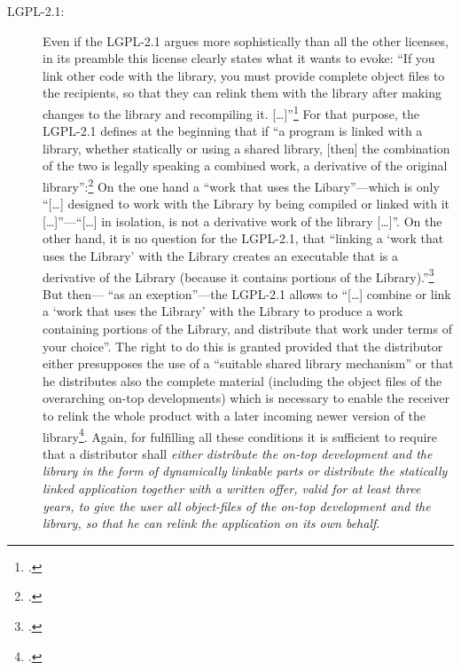 \begin{description}
  \item[LGPL-2.1:] Even if the LGPL-2.1 argues more sophistically than all
  the other licenses, in its preamble this license clearly states what it wants
  to evoke: \enquote{If you link other code with the library, you must provide
  complete object files to the recipients, so that they can relink them with the
  library after making changes to the library and recompiling it.
  [\ldots]}\footcite[cf.][\nopage wp.\ preamble]{Lgpl21OsiLicense1999a} For
  that purpose, the LGPL-2.1 defines at the beginning that if \enquote{a program
  is linked with a library, whether statically or using a shared library, [then]
  the combination of the two is legally speaking a combined work, a derivative
  of the original library}:\footcite[cf.][\nopage wp.\
  preamble]{Lgpl21OsiLicense1999a} On the one hand a \enquote{work that uses
  the Libary}---which is only \enquote{[\ldots] designed to work with the
  Library by being compiled or linked with it [\ldots]}---\enquote{[\ldots] in
  isolation, is not a derivative work of the library [\ldots]}. On the other
  hand, it is no question for the LGPL-2.1, that \enquote{linking a
  \enquote{work that uses the Library} with the Library creates an executable
  that is a derivative of the Library (because it contains portions of the
  Library).}\footcite[cf.][\nopage wp.\ §5]{Lgpl21OsiLicense1999a} But then---%
  \enquote{as an exeption}---the LGPL-2.1 allows to \enquote{[\ldots] combine
  or link a \enquote{work that uses the Library} with the Library to produce a work
  containing portions of the Library, and distribute that work under terms of
  your choice}. The right to do this is granted provided that the distributor
  either presupposes the use of a \enquote{suitable shared library mechanism} or
  that he distributes also the complete material (including the object files of
  the overarching on-top developments) which is necessary to enable the receiver
  to relink the whole product with a later incoming newer version of the
  library\footcite[cf.][\nopage wp.\ §6, §6b and §6c together with
  §6c]{Lgpl21OsiLicense1999a}. Again, for fulfilling all these conditions it is
  sufficient to require that a distributor shall \emph{either distribute the
  on-top development and the library in the form of dynamically linkable parts
  or distribute the statically linked application together with a written offer,
  valid for at least three years, to give the user all object-files of the
  on-top development and the library, so that he can relink the application on
  its own behalf}.

\end{description}

